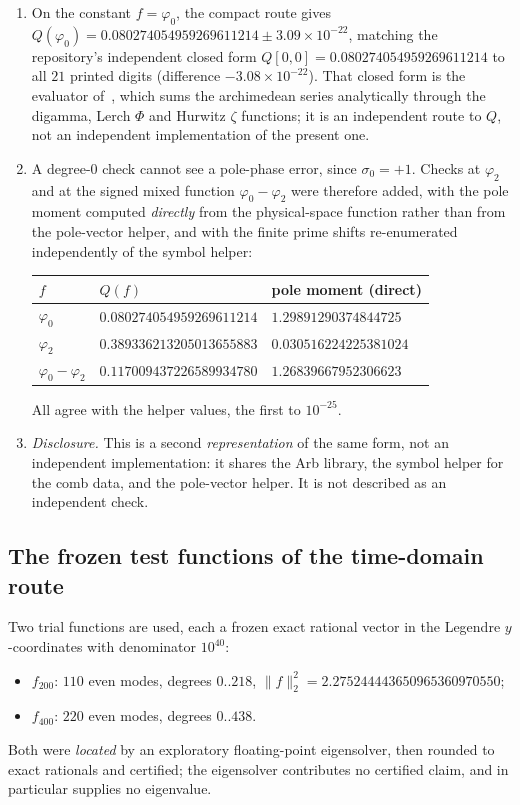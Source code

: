 \documentclass[11pt,a4paper]{article}
\theoremstyle{definition}
\theoremstyle{remark}
\begin{document}
\begin{enumerate}
\item[(a)] On the constant $f = \varphi_0$, the compact route gives
  $Q(\varphi_0) = 0.080274054959269611214 \pm 3.09\times10^{-22}$, matching the
  repository's independent closed form $Q[0,0] = 0.080274054959269611214$ to all
  $21$ printed digits (difference $-3.08\times10^{-22}$). That closed form is the
  evaluator of~\cite{Sensitivity}, which sums the archimedean series analytically
  through the digamma, Lerch $\Phi$ and Hurwitz $\zeta$ functions; it is an
  independent route to $Q$, not an independent implementation of the present
  one.
\item[(b)] A degree-$0$ check cannot see a pole-phase error, since
  $\sigma_0 = +1$. Checks at $\varphi_2$ and at the signed mixed function
  $\varphi_0 - \varphi_2$ were therefore added, with the pole moment computed
  \emph{directly} from the physical-space function rather than from the
  pole-vector helper, and with the finite prime shifts re-enumerated
  independently of the symbol helper:
  \begin{center}
  \begin{tabular}{lll}
  \toprule
  $f$ & $Q(f)$ & pole moment (direct) \\
  \midrule
  $\varphi_0$ & $0.080274054959269611214$ & $1.29891290374844725$ \\
  $\varphi_2$ & $0.389336213205013655883$ & $0.030516224225381024$ \\
  $\varphi_0 - \varphi_2$ & $0.117009437226589934780$ & $1.26839667952306623$ \\
  \bottomrule
  \end{tabular}
  \end{center}
  All agree with the helper values, the first to $10^{-25}$.
\item[(c)] \emph{Disclosure.} This is a second \emph{representation} of the same
  form, not an independent implementation: it shares the Arb library, the symbol
  helper for the comb data, and the pole-vector helper. It is not described as an
  independent check.
\end{enumerate}

\subsection{The frozen test functions of the time-domain route}

Two trial functions are used, each a frozen exact rational vector in the
Legendre $y$-coordinates with denominator $10^{40}$:
\begin{itemize}
\item $f_{200}$: $110$ even modes, degrees $0..218$, $\|f\|_2^2 =
  2.275244443650965360970550$;
\item $f_{400}$: $220$ even modes, degrees $0..438$.
\end{itemize}
Both were \emph{located} by an exploratory floating-point eigensolver, then
rounded to exact rationals and certified; the eigensolver contributes no
certified claim, and in particular supplies no eigenvalue.
\end{document}
